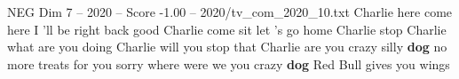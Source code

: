 \begin{textsample}{NEG Dim 7 – 2020 – Score -1.00 – 2020/tv\_com\_2020\_10.txt}  \label{ex:f7_neg_004}
Charlie here come here I 'll be right back good Charlie come sit let 's go home Charlie stop Charlie what are you doing Charlie will you stop that Charlie are you crazy silly \textbf{dog} no more treats for you sorry where were we you crazy \textbf{dog} Red Bull gives you wings

\end{textsample}

